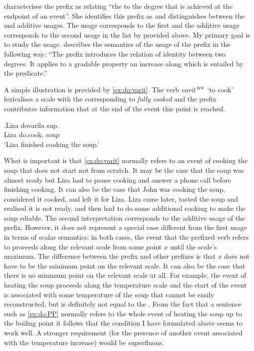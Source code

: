 \citet[70]{Kagan:book} characterises the prefix  as relating ``the  to the degree that is achieved at the endpoint of an event''. She identifies this prefix as  and distinguishes between the  and additive  usages. The  usage corresponds to the first and the additive usage corresponds to the second usage in the list by \citet{Shvedova:82} provided above. My primary goal is to study the  usage. \citet[72]{Kagan:book} describes the semantics of the  usage of the prefix  in the following way: ``The prefix introduces the relation of identity between two degrees. It applies to a gradable property an increase along which is entailed by the predicate.''

A simple illustration is provided by \ref{ex:do:varit}. The verb \textit{varit'}$^{\textsc{ipf}}$ `to cook' lexicalises a scale with the  corresponding to \textit{fully cooked} and the prefix  contributes information that at the end of the event this point is reached.\largerpage[-2]

\exg.\label{ex:do:varit}Liza dovarila sup.\\
Liza do.cook. soup\\
\trans `Liza finished cooking the soup.'

What is important is that \ref{ex:do:varit} normally refers to an event of cooking the soup that does not start not from scratch. It may be the case that the soup was almost ready but Liza had to pause cooking and answer a phone call before finishing cooking. It can also be the case that John was cooking the soup, considered it cooked, and left it for Liza. Liza came later, tasted the soup and realised it is not ready, and then had to do some additional cooking to make the soup ediable. The second interpretation corresponds to the additive usage of the prefix. However, it does not represent a special case different from the first usage in terms of scalar semantics: in both cases, the event that the prefixed verb refers to proceeds along the relevant scale from some point $x$ until the scale's maximum. The difference between the prefix  and other prefixes is that $x$ does not have to be the minimum point on the relevant scale. It can also be the case that there is no minimum point on the relevant scale at all. For example, the event of heating the soup proceeds along the temperature scale and the start of the event is associated with some temperature of the soup that cannot be easily reconstructed, but is definitely not equal to the . From the fact that a sentence such as \ref{ex:do:PP} normally refers to the whole event of heating the soup up to the boiling point it follows that the condition I have formulated above seems to work well. A stronger requirement (for the presence of another event associated with the temperature increase) would be superfluous.

